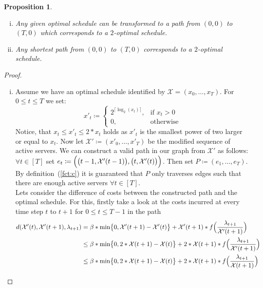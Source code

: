 \documentclass[hidelinks]{article}
\theoremstyle{plain}
\newtheorem{prop}[thm]{Proposition}
\theoremstyle{definition}
\theoremstyle{rem}
\begin{document}
\begin{sloppypar}
\begin{prop}
$ $
\begin{enumerate}[(i)]
	\item Any given optimal schedule can be transformed to a path from $(0,0)$ to $(T,0)$ which corresponds to a $2$-optimal schedule.
	\item Any shortest path from $(0,0)$ to $(T,0)$ corresponds to a $2$-optimal schedule.
\end{enumerate}
\end{prop}
\begin{proof}
$ $
\begin{enumerate}[(i)]
	\item Assume we have an optimal schedule identified by $\mathcal{X}=(x_0,\ldots,x_T)$. For $0\le t\le T$ we set:
	\begin{equation}
		x'_t\coloneqq 
		\begin{cases}
		  2^{\lceil\log_2(x_t)\rceil}, & \text{if $x_t>0$}\\
		  0, & \text{otherwise}
		\end{cases} 
	\end{equation}
	Notice, that $x_t\le x'_t\le 2*x_t$ holds as $x'_t$ is the smallest power of two larger or equal to $x_t$. Now let $\mathcal{X}'\coloneqq(x'_0,\ldots,x'_T)$ be the modified sequence of active servers.
	We can construct a valid path in our graph from $\mathcal{X'}$ as follows:\\
	$\forall t\in[T]$ set $e_t\coloneqq\Bigl(\bigl(t-1,\mathcal{X}'(t-1)\bigr),\bigl(t,\mathcal{X}'(t)\bigr)\Bigr)$. Then set $P\coloneqq(e_1,\ldots,e_{T})$. By definition~(\ref{fct:c}) it is guaranteed that $P$ only traverses edges such that there are enough active servers $\forall t\in[T]$.\\
	Lets consider the difference of costs between the constructed path and the optimal schedule. For this, firstly take a look at the costs incurred at every time step $t$ to $t+1$ for $0\le t\le T-1$ in the path
	\begin{alignat*}{2}
		d(\mathcal{X}'(t),\mathcal{X}'(t+1),\lambda_{t+1})&=\beta*\min\bigl\{0,\mathcal{X}'(t+1)-\mathcal{X}'(t)\bigr\}+\mathcal{X}'(t+1)*f\Bigl(\frac{\lambda_{t+1}}{\mathcal{X}'(t+1)}\Bigr)\\
		&\le \beta*\min\bigl\{0,2*\mathcal{X}(t+1)-\mathcal{X}(t)\bigr\}+2*\mathcal{X}(t+1)*f\Bigl(\frac{\lambda_{t+1}}{\mathcal{X}'(t+1)}\Bigr)\\
		&\le \beta*\min\bigl\{0,2*\mathcal{X}(t+1)-\mathcal{X}(t)\bigr\}+2*\mathcal{X}(t+1)*f\Bigl(\frac{\lambda_{t+1}}{\mathcal{X}(t+1)}\Bigr)\\

\end{alignat*}
\end{enumerate}
\end{proof}
\end{sloppypar}
\end{document}
